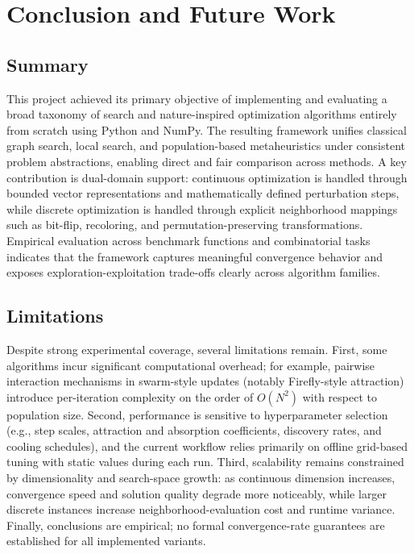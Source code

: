 \section{Conclusion and Future Work}
\label{sec:conclusion}

\subsection{Summary}
\label{subsec:summary}
This project achieved its primary objective of implementing and evaluating a broad taxonomy of search and nature-inspired optimization algorithms entirely from scratch using Python and NumPy. The resulting framework unifies classical graph search, local search, and population-based metaheuristics under consistent problem abstractions, enabling direct and fair comparison across methods. A key contribution is dual-domain support: continuous optimization is handled through bounded vector representations and mathematically defined perturbation steps, while discrete optimization is handled through explicit neighborhood mappings such as bit-flip, recoloring, and permutation-preserving transformations. Empirical evaluation across benchmark functions and combinatorial tasks indicates that the framework captures meaningful convergence behavior and exposes exploration-exploitation trade-offs clearly across algorithm families.

\subsection{Limitations}
\label{subsec:limitations}
Despite strong experimental coverage, several limitations remain. First, some algorithms incur significant computational overhead; for example, pairwise interaction mechanisms in swarm-style updates (notably Firefly-style attraction) introduce per-iteration complexity on the order of $O(N^2)$ with respect to population size. Second, performance is sensitive to hyperparameter selection (e.g., step scales, attraction and absorption coefficients, discovery rates, and cooling schedules), and the current workflow relies primarily on offline grid-based tuning with static values during each run. Third, scalability remains constrained by dimensionality and search-space growth: as continuous dimension increases, convergence speed and solution quality degrade more noticeably, while larger discrete instances increase neighborhood-evaluation cost and runtime variance. Finally, conclusions are empirical; no formal convergence-rate guarantees are established for all implemented variants.

